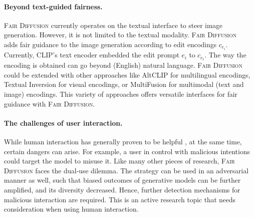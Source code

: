 \documentclass{article}%
\begin{document}
\paragraph{Beyond text-guided fairness.} 
\textsc{Fair Diffusion} currently operates on the textual interface to steer image generation. However, it is not limited to the textual modality.  \textsc{Fair Diffusion} adds fair guidance to the image generation according to edit encodings $c_{e_i}$. Currently, CLIP's text encoder embedded the edit prompt $e_i$ to $c_{e_i}$. The way the encoding is obtained can go beyond (English) natural language. \textsc{Fair Diffusion} could be extended with other approaches like AltCLIP \cite{chen22altclip} for multilingual encodings, 
Textual Inversion \cite{Gal22Textinversion} for visual encodings, or MultiFusion \cite{bellagente2023multifusion} for multimodal (text and image) encodings. This variety of approaches offers versatile interfaces for fair guidance with \textsc{Fair Diffusion}.

\paragraph{The challenges of user interaction.} While human interaction has generally proven to be helpful \cite{teso2019xil,Ouyang2022TrainingLM,friedrich2022XIL_typo, friedrich22rit}, at the same time, certain dangers can arise. For example, a user in control with malicious intentions could target the model to misuse it. Like many other pieces of research, \textsc{Fair Diffusion} faces the dual-use dilemma. The strategy can be used in an adversarial manner as well, such that biased outcomes of generative models can be further amplified, and its diversity decreased. Hence, further detection mechanisms for malicious interaction are required. This is an active research topic \cite{avoidtrolls_ju} that needs consideration when using human interaction. \\
\end{document}
